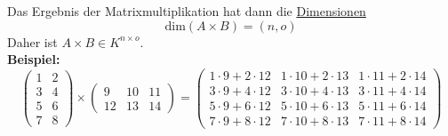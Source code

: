 \documentclass[../../main.tex]{subfiles}
\begin{document}
\begin{definition}[Matrixmultiplikation]
		Das Ergebnis der Matrixmultiplikation hat dann die \hyperref[def:DimensionMatrix]{Dimensionen} $$\textrm{dim}(A \times B) = (n,o)$$
		Daher ist $A \times B \in K^{n \times o}$. \\
		
	
		\textbf{Beispiel:}		
		$$
		\begin{pmatrix} 1 & 2 \\ 3 & 4 \\ 5 & 6 \\ 7 & 8\end{pmatrix} 
		\times 
		\begin{pmatrix} 9 & 10 & 11 \\ 12 & 13 & 14\end{pmatrix}
		=
		\begin{pmatrix} 
		1 \cdot 9 + 2 \cdot 12 & 1 \cdot 10 + 2 \cdot 13  & 1 \cdot 11 + 2 \cdot 14 \\ 
		3 \cdot 9 + 4 \cdot 12 & 3 \cdot 10 + 4 \cdot 13  & 3 \cdot 11 + 4 \cdot 14 \\
		5 \cdot 9 + 6 \cdot 12 & 5 \cdot 10 + 6 \cdot 13  & 5 \cdot 11 + 6 \cdot 14 \\
		7 \cdot 9 + 8 \cdot 12 & 7 \cdot 10 + 8 \cdot 13  & 7 \cdot 11 + 8 \cdot 14
		\end{pmatrix}
		$$
		
	\end{definition}
	
\end{document}
